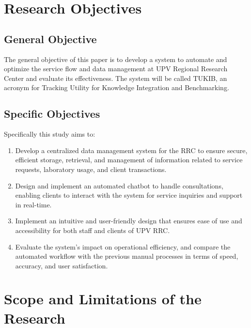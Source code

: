 \section{Research Objectives}
\label{sec:researchobjectives}

\subsection{General Objective}
\label{sec:generalobjective}

The general objective of this paper is to develop a system to automate and optimize the service flow and data management at UPV Regional Research Center and evaluate its effectiveness. The system will be called TUKIB, an acronym for Tracking Utility for Knowledge Integration and Benchmarking. 

\subsection{Specific Objectives}
\label{sec:specificobjectives}

Specifically this study aims to:

\begin{enumerate}
   
   \item Develop a centralized data management system for the RRC to ensure secure, efficient storage, retrieval, and management of information related to service requests, laboratory usage, and client transactions.
   
   \item Design and implement an automated chatbot to handle consultations, enabling clients to interact with the system for service inquiries and support in real-time.
   
   
   \item Implement an intuitive and user-friendly design that ensures ease of use and accessibility for both staff and clients of UPV RRC.
   
   \item Evaluate the system’s impact on operational efficiency, and compare the automated workflow with the previous manual processes in terms of speed, accuracy, and user satisfaction.
   
\end{enumerate}


\section{Scope and Limitations of the Research}
\label{sec:scopelimitations}

